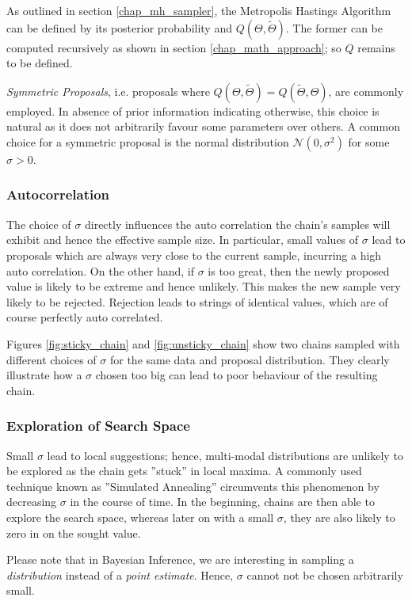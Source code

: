 
As outlined in section \ref{chap_mh_sampler}, the Metropolis Hastings Algorithm can be defined by its posterior probability and $Q(\Theta, \tilde{\Theta})$. The former can be computed recursively as shown in section \ref{chap_math_approach}; so $Q$ remains to be defined.

\textit{Symmetric Proposals}, i.e. proposals where $Q(\Theta, \tilde{\Theta}) = Q(\tilde{\Theta}, \Theta)$, are commonly employed. In absence of prior information indicating otherwise, this choice is natural as it does not arbitrarily favour some parameters over others. A common choice for a symmetric proposal is the normal distribution $\mathcal{N}(0, \sigma^2)$ for some $\sigma > 0$. 


\subsubsection*{Autocorrelation}
The choice of $\sigma$ directly influences the auto correlation the chain's samples will exhibit and hence the effective sample size. In particular, small values of $\sigma$ lead to proposals which are always very close to the current sample, incurring a high auto correlation. On the other hand, if $\sigma$ is too great, then the newly proposed value is likely to be extreme and hence unlikely. This makes the new sample very likely to be rejected. Rejection leads to strings of identical values, which are of course perfectly auto correlated.

Figures \ref{fig:sticky_chain} and \ref{fig:unsticky_chain} show two chains sampled with different choices of $\sigma$ for the same data and proposal distribution. They clearly illustrate how a $\sigma$ chosen too big can lead to poor behaviour of the resulting chain. 


\subsubsection*{Exploration of Search Space}
Small $\sigma$ lead to local suggestions; hence, multi-modal distributions are unlikely to be explored as the chain gets ''stuck'' in local maxima. A commonly used technique known as ''Simulated Annealing'' circumvents this phenomenon by decreasing $\sigma$ in the course of time. In the beginning, chains are then able to explore the search space, whereas later on with a small $\sigma$, they are also likely to zero in on the sought value. 

Please note that in Bayesian Inference, we are interesting in sampling a \textit{distribution} instead of a \textit{point estimate}. Hence, $\sigma$ cannot not be chosen arbitrarily small. 

